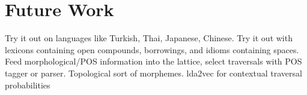 \chapter{Future Work}
Try it out on languages like Turkish, Thai, Japanese, Chinese.
Try it out with lexicons containing open compounds, borrowings, and idioms containing spaces.
Feed morphological/POS information into the lattice, select traversals with POS tagger or parser.
Topological sort of morphemes.
lda2vec for contextual traversal probabilities
